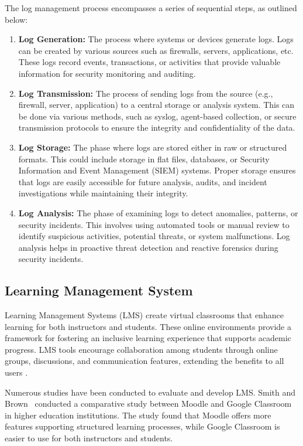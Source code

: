 The log management process encompasses a series of sequential steps, as outlined below:
\begin{enumerate}
\item \textbf{Log Generation:} The process where systems or devices generate logs. Logs can be created by various sources such as firewalls, servers, applications, etc. These logs record events, transactions, or activities that provide valuable information for security monitoring and auditing.

    \item \textbf{Log Transmission:} The process of sending logs from the source (e.g., firewall, server, application) to a central storage or analysis system. This can be done via various methods, such as syslog, agent-based collection, or secure transmission protocols to ensure the integrity and confidentiality of the data.

    \item \textbf{Log Storage:} The phase where logs are stored either in raw or structured formats. This could include storage in flat files, databases, or Security Information and Event Management (SIEM) systems. Proper storage ensures that logs are easily accessible for future analysis, audits, and incident investigations while maintaining their integrity.

    \item \textbf{Log Analysis:} The phase of examining logs to detect anomalies, patterns, or security incidents. This involves using automated tools or manual review to identify suspicious activities, potential threats, or system malfunctions. Log analysis helps in proactive threat detection and reactive forensics during security incidents.
\end{enumerate}

\subsection{Learning Management System} Learning Management Systems (LMS) create virtual classrooms that enhance learning for both instructors and students.  These online environments provide a framework for fostering an inclusive learning experience that supports academic progress. LMS tools encourage collaboration among students through online groups, discussions, and communication features, extending the benefits to all users \cite{bradley2021learninglms}. 

Numerous studies have been conducted to evaluate and develop LMS. Smith and Brown~\cite{smith2020} conducted a comparative study between Moodle and Google Classroom in higher education institutions. The study found that Moodle offers more features supporting structured learning processes, while Google Classroom is easier to use for both instructors and students.

